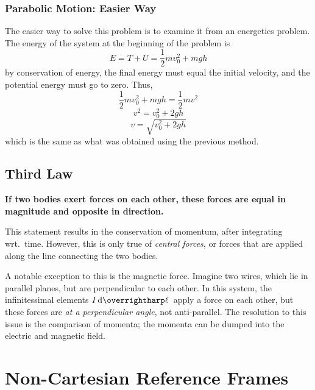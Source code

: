 \subsubsection{Parabolic Motion: Easier Way}
The easier way to solve this problem is to examine it from an energetics problem. The energy of the system at the beginning of the problem is
\[E=T+U=\frac{1}{2}mv_0^2+mgh\]
by conservation of energy, the final energy must equal the initial velocity, and the potential energy must go to zero. Thus,
\[\frac{1}{2}mv_0^2+mgh=\frac{1}{2}mv^2\]
\[v^2=v_0^2+2gh\]
\[v=\sqrt{v_0^2+2gh}\]
which is the same as what was obtained using the previous method.
\subsection{Third Law}
{\bfseries If two bodies exert forces on each other, these forces are equal in magnitude and opposite in direction.}

This statement results in the conservation of momentum, after integrating wrt.\ time. However, this is only true of \emph{central forces}, or forces that are applied along the line connecting the two bodies.

A notable exception to this is the magnetic force. Imagine two wires, which lie in parallel planes, but are perpendicular to each other.
In this system, the infinitessimal elements \(I\d{\vv{\ell}}\) apply a force on each other, but these forces are \emph{at a perpendicular angle}, not anti-parallel.
The resolution to this issue is the comparison of momenta; the momenta can be dumped into the electric and magnetic field.

\section{Non-Cartesian Reference Frames}
